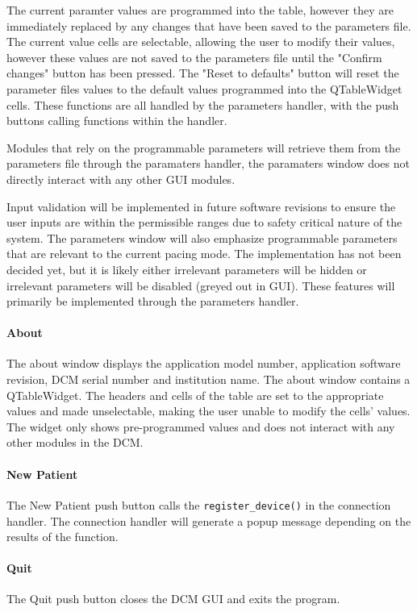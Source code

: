 \documentclass[12pt]{article}
\begin{document}
The current paramter values are programmed into the table, however they are immediately replaced by any changes that have been saved to the parameters file. The current value cells are selectable, allowing the user to modify their values, however these values are not saved to the parameters file until the "Confirm changes" button has been pressed. The "Reset to defaults" button will reset the parameter files values to the default values programmed into the QTableWidget cells. These functions are all handled by the parameters handler, with the push buttons calling functions within the handler.

Modules that rely on the programmable parameters will retrieve them from the parameters file through the paramaters handler, the paramaters window does not directly interact with any other GUI modules.

Input validation will be implemented in future software revisions to ensure the user inputs are within the permissible ranges due to safety critical nature of the system. The parameters window will also emphasize programmable parameters that are relevant to the current pacing mode. The implementation has not been decided yet, but it is likely either irrelevant parameters will be hidden or irrelevant parameters will be disabled (greyed out in GUI). These features will primarily be implemented through the parameters handler.   

\paragraph{About}
The about window displays the application model number, application software revision, DCM serial number and institution name. The about window contains a QTableWidget. The headers and cells of the table are set to the appropriate values and made unselectable, making the user unable to modify the cells' values. The widget only shows pre-programmed values and does not interact with any other modules in the DCM.

\paragraph{New Patient}
The New Patient push button calls the \verb|register_device()| in the connection handler. The connection handler will generate a popup message depending on the results of the function.

\paragraph{Quit}
The Quit push button closes the DCM GUI and exits the program.
\end{document}
